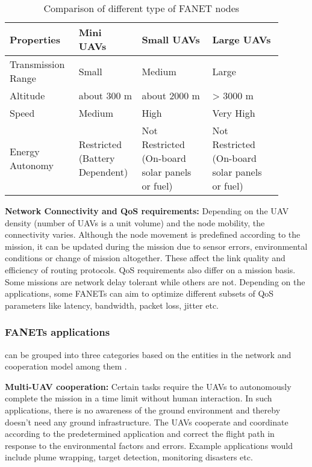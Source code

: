 \begin{table}
\caption{Comparison of different type of FANET nodes}
\label{tab:uav_comparison}
\begin{tabular}{|p{0.21\linewidth}|p{0.21\linewidth}|p{0.24\linewidth}|p{0.24\linewidth}|}
\toprule
Properties & Mini UAVs & Small UAVs & Large UAVs\\
\midrule
Transmission Range & Small & Medium & Large\\
\midrule
Altitude 	&  about 300 m   & about 2000 m  &  > 3000 m \\
\midrule
Speed & Medium & High & Very High \\
\midrule
Energy Autonomy & Restricted (Battery Dependent) & Not Restricted (On-board solar panels or fuel) &  Not Restricted (On-board solar panels or fuel) \\
\bottomrule
\end{tabular}
\end{table}

\textbf{Network Connectivity and QoS requirements:} Depending on the UAV density (number of UAVs is a unit volume) and the node mobility, the connectivity varies. Although the node movement is predefined according to the mission, it can be updated during the mission due to sensor errors, environmental conditions or change of mission altogether. These affect the link quality and efficiency of routing protocols. QoS requirements also differ on a mission basis. Some missions are network delay tolerant while others are not. Depending on the applications, some FANETs can aim to optimize different subsets of QoS parameters like latency, bandwidth, packet loss, jitter etc.


\subsubsection{FANETs applications} can be grouped into three categories based on the entities in the network and cooperation model among them \cite{BEKMEZCI20131254}.

\textbf{Multi-UAV cooperation:} Certain tasks require the UAVs to autonomously complete the mission in a time limit without human interaction. In such applications, there is no awareness of the ground environment and thereby doesn't need any ground infrastructure. The UAVs cooperate and coordinate according to the predetermined application and correct the flight path in response to the environmental factors and errors. Example applications would include plume wrapping, target detection, monitoring disasters etc. 

